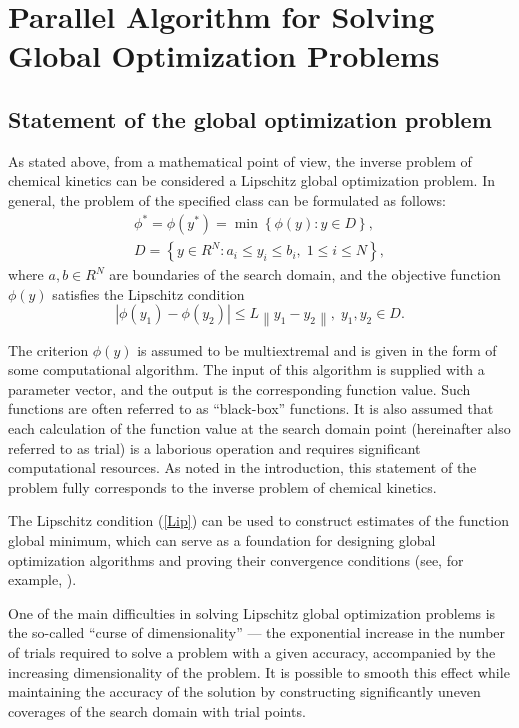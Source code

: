 \documentclass[mathematics,article,submit,pdftex,moreauthors]{Definitions/mdpi}
\begin{document}
\section{Parallel Algorithm for Solving Global Optimization Problems }\label{sec_GSA}

\subsection{Statement of the global optimization problem}

As stated above, from a mathematical point of view, the inverse problem of chemical kinetics can be considered a Lipschitz global optimization problem. 
In general, the problem of the specified class can be formulated as follows:
\begin{gather}
 \phi^* = \phi(y^\ast)=\min{\left\{\phi(y):y\in D\right\}}, \label{problemN}\\
 D=\left\{y\in R^N: a_i\leq y_i \leq b_i, \;  1\leq i \leq N\right\} \label{D},
\end{gather}
where $a,b \in R^N$ are boundaries of the search domain, and the objective function $\phi(y)$ satisfies the Lipschitz condition
\begin{equation}\label{Lip}
\left|\phi(y_1)-\phi(y_2)\right|\leq L\left\|y_1-y_2\right\|,\; y_1,y_2 \in D.
\end{equation}

The criterion $\phi(y)$ is assumed to be multiextremal and is given in the form of some computational algorithm. The input of this algorithm is supplied with a parameter vector, and the output is the corresponding function value. Such functions are often referred to as ``black-box'' functions. It is also assumed that each calculation of the function value at the search domain point (hereinafter also referred to as trial) is a laborious operation and requires significant computational resources. As noted in the introduction, this statement of the problem fully corresponds to the inverse problem of chemical kinetics.

The Lipschitz condition (\ref{Lip}) can be used to construct estimates of the function global minimum, which can serve as a foundation for designing global optimization algorithms and proving their convergence conditions (see, for example, \cite{Strongin2000}).

One of the main difficulties in solving Lipschitz global optimization problems is the so-called ``curse of dimensionality'' --- the exponential increase in the number of trials required to solve a problem with a given accuracy, accompanied by the increasing dimensionality of the problem. It is possible to smooth this effect while maintaining the accuracy of the solution by constructing significantly uneven coverages of the search domain with trial points.
\end{document}

